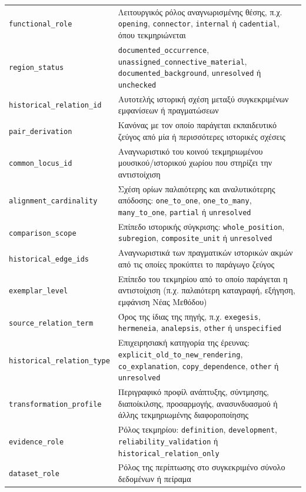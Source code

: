 \documentclass[11pt,a4paper]{article}
\begin{document}
{\begin{xltabular}{\textwidth}{@{}p{0.27\textwidth}Y@{}}
\texttt{functional\_role} & Λειτουργικός ρόλος αναγνωρισμένης θέσης, π.χ. \texttt{opening}, \texttt{connector}, \texttt{internal} ή \texttt{cadential}, όπου τεκμηριώνεται\\
\texttt{region\_status} & \texttt{documented\_occurrence}, \texttt{unassigned\_connective\_material}, \texttt{documented\_background}, \texttt{unresolved} ή \texttt{unchecked}\\
\texttt{historical\_relation\_id} & Αυτοτελής ιστορική σχέση μεταξύ συγκεκριμένων εμφανίσεων ή πραγματώσεων\\
\texttt{pair\_derivation} & Κανόνας με τον οποίο παράγεται εκπαιδευτικό ζεύγος από μία ή περισσότερες ιστορικές σχέσεις\\
\texttt{common\_locus\_id} & Αναγνωριστικό του κοινού τεκμηριωμένου μουσικού/ιστορικού χωρίου που στηρίζει την αντιστοίχιση\\
\texttt{alignment\_cardinality} & Σχέση ορίων παλαιότερης και αναλυτικότερης απόδοσης: \texttt{one\_to\_one}, \texttt{one\_to\_many}, \texttt{many\_to\_one}, \texttt{partial} ή \texttt{unresolved}\\
\texttt{comparison\_scope} & Επίπεδο ιστορικής σύγκρισης: \texttt{whole\_position}, \texttt{subregion}, \texttt{composite\_unit} ή \texttt{unresolved}\\
\texttt{historical\_edge\_ids} & Αναγνωριστικά των πραγματικών ιστορικών ακμών από τις οποίες προκύπτει το παράγωγο ζεύγος\\
\texttt{exemplar\_level} & Επίπεδο του τεκμηρίου από το οποίο παράγεται η αντιστοίχιση (π.χ. παλαιότερη καταγραφή, εξήγηση, εμφάνιση Νέας Μεθόδου)\\
\texttt{source\_relation\_term} & Όρος της ίδιας της πηγής, π.χ. \texttt{exegesis}, \texttt{hermeneia}, \texttt{analepsis}, \texttt{other} ή \texttt{unspecified}\\
\texttt{historical\_relation\_type} & Επιχειρησιακή κατηγορία της έρευνας: \texttt{explicit\_old\_to\_new\_rendering}, \texttt{co\_explanation}, \texttt{copy\_dependence}, \texttt{other} ή \texttt{unresolved}\\
\texttt{transformation\_profile} & Περιγραφικό προφίλ ανάπτυξης, σύντμησης, διαποίκιλσης, προσαρμογής, ανασυνδυασμού ή άλλης τεκμηριωμένης διαφοροποίησης\\
\texttt{evidence\_role} & Ρόλος τεκμηρίου: \texttt{definition}, \texttt{development}, \texttt{reliability\_validation} ή \texttt{historical\_relation\_only}\\
\texttt{dataset\_role} & Ρόλος της περίπτωσης στο συγκεκριμένο σύνολο δεδομένων ή πείραμα\\
\end{xltabular}
}\par
\end{document}
